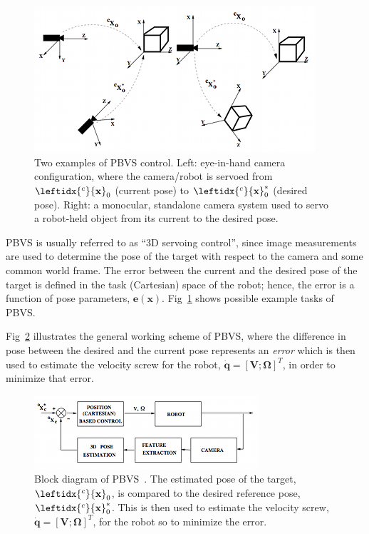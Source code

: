 \begin{figure}
\centering
\includegraphics[scale=0.9]{figures/pbvs_examples}
\caption[Examples of \ac{PBVS}]{Two examples of \ac{PBVS} control. Left: eye-in-hand camera configuration, where the camera/robot is servoed from $\leftidx{^c}{\mathbf{x}}_0$ (current pose) to $\leftidx{^c}{\mathbf{x}}_0^*$ (desired pose). Right: a monocular, standalone camera system used to servo a robot-held object from its current to the desired pose.} 
\label{img:pbvs_examples}
\end{figure}

\ac{PBVS} is usually referred to as ``3D servoing control'', since image measurements are used to determine the pose of the target with respect to the camera and some common world frame. The error between the current and the desired pose of the target is defined in the task (Cartesian) space of the robot; hence, the error is a function of pose parameters, $\mathbf{e}(\mathbf{x})$. Fig~\ref{img:pbvs_examples} shows possible example tasks of \ac{PBVS}.

Fig~\ref{img:pbvs_block_diagram} illustrates the general working scheme of \ac{PBVS}, where the difference in pose between the desired and the current pose represents an \emph{error} which is then used to estimate the velocity screw for the robot, $\dot{\mathbf{q}} = [ \mathbf{V}; \mathbf{\Omega} ]^T$, in order to minimize that error.

\begin{figure}
\centering
\includegraphics{figures/pbvs_block_diagram}
\caption[Block diagram of \ac{PBVS}]{Block diagram of \ac{PBVS}~\cite{hutchinson:1996}. The estimated pose of the target, $\leftidx{^c}{\mathbf{x}}_0$, is compared to the desired reference pose, $\leftidx{^c}{\mathbf{x}}_0^*$. This is then used to estimate the velocity screw, $\dot{\mathbf{q}} = [ \mathbf{V}; \mathbf{\Omega} ]^T$, for the robot so to minimize the error.}
\label{img:pbvs_block_diagram}
\end{figure}

